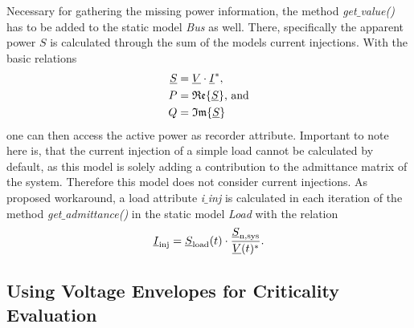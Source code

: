 Necessary for gathering the missing power information, the method \textit{get$\_$value()} has to be added to the static model \textit{Bus} as well.
There, specifically the apparent power $S$ is calculated through the sum of the models current injections.
With the basic relations
\begin{align}
        \underline{S}&=\underline{V} \cdot \underline{I}^* \notag, \\
        P&=\mathfrak{Re} \{\underline{S}\}\text{, and} \notag \\
        Q&=\mathfrak{Im} \{\underline{S}\} \notag
\end{align}
one can then access the active power as recorder attribute. 
Important to note here is, that the current injection of a simple load cannot be calculated by default, as this model is solely adding a contribution to the admittance matrix of the system.
Therefore this model does not consider current injections.
As proposed workaround, a load attribute \textit{i$\_$inj} is calculated in each iteration of the method \textit{get$\_$admittance()} in the static model \textit{Load} with the relation
\begin{align}
        \underline{I}_\mathrm{inj}=\underline{S}_\mathrm{load}(t) \cdot \frac{\underline{S}_\mathrm{n,sys}}{\underline{V}(t)^*}. \notag
\end{align}


        
\subsection{Using Voltage Envelopes for Criticality Evaluation}
\label{sec:comb-rating-tool}

